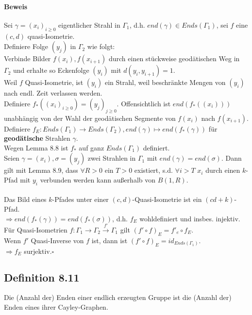 \documentclass{article}
\newcommand{\qed}{\hfill $\square$}
\begin{document}
\paragraph{Beweis}
Sei $\gamma = (x_i)_{i\geq 0}$ eigentlicher Strahl in $\Gamma_1$, d.h. $end(\gamma) \in Ends(\Gamma_1)$, sei $f$ eine $(c,d)$ quasi-Isometrie.\\
Definiere Folge $(y_j)$ in $\Gamma_2$ wie folgt:\\
Verbinde Bilder $f(x_i), f(x_{i+1})$ durch einen stückweise geodätischen Weg in $\Gamma_2$ und erhalte so Eckenfolge $(y_i)$ mit $d(y_i, y_{i+1}) = 1$.\\
Weil $f$ Quasi-Isometrie, ist $(y_i)$ ein Strahl, weil beschränkte Mengen von $(y_i)$ nach endl. Zeit verlassen werden.\\
Definiere $f_*((x_i)_{i \geq 0}) = (y_j)_{j\geq 0}$. Offensichtlich ist $end(f_*((x_i)))$ unabhängig von der Wahl der geodätischen Segmente von $f(x_i)$ nach $f(x_{i+1})$.\\
Definiere $f_E : Ends(\Gamma_1) \rightarrow Ends(\Gamma_2), end(\gamma) \mapsto end(f_*(\gamma))$ für \textbf{geodätische} Strahlen $\gamma$.\\
Wegen Lemma 8.8 ist $f_*$ auf ganz $Ends(\Gamma_1)$ definiert.\\
Seien $\gamma = (x_i), \sigma = (y_j)$ zwei Strahlen in $\Gamma_1$ mit $end(\gamma) = end(\sigma)$. Dann gilt mit Lemma 8.9, dass $\forall R > 0$ ein $T> 0$ existiert, s.d. $\forall i > T$ $x_i$ durch einen $k$-Pfad mit $y_i$ verbunden werden kann außerhalb von $B(1,R)$.\\\\

Das Bild eines $k$-Pfades unter einer $(c,d)$-Quasi-Isometrie ist ein $(cd+k)$-Pfad.\\
$\Longrightarrow end(f_*(\gamma)) = end(f_*(\sigma))$, d.h. $f_E$ wohldefiniert und insbes. injektiv.\\
Für Quasi-Isometrien $f: \Gamma_1 \rightarrow \Gamma_2 \overset{f'}{\rightarrow} \Gamma_1$ gilt $(f'\circ f)_E = f'_e \circ f_E$.\\
Wenn $f'$ Quasi-Inverse von $f$ ist, dann ist $(f'\circ f)_E = id_{Ends(\Gamma_1)}$.\\
$\Longrightarrow f_E$ surjektiv.\qed


\subsection{Definition 8.11}
Die (Anzahl der) Enden einer endlich erzeugten Gruppe ist die (Anzahl der) Enden eines ihrer Cayley-Graphen.
\end{document}
